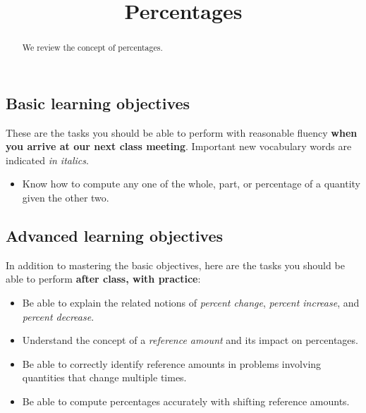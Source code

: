 \documentclass{ximera}
\title{Percentages}
\begin{document}
\begin{abstract}
We review the concept of percentages.
\end{abstract}
\maketitle

\subsection*{Basic learning objectives}

These are the tasks you should be able to perform with reasonable fluency \textbf{when you arrive at our next class meeting}. Important new vocabulary words are indicated \emph{in italics}. 

\begin{itemize}
	\item Know how to compute any one of the whole, part, or percentage of a quantity given the other two.
\end{itemize}

\subsection*{Advanced learning objectives}

In addition to mastering the basic objectives, here are the tasks you should be able to perform \textbf{after class, with practice}: 

\begin{itemize}
	\item Be able to explain the related notions of \emph{percent change}, \emph{percent increase}, and \emph{percent decrease}.
	\item Understand the concept of a \emph{reference amount} and its impact on percentages.
	\item Be able to correctly identify reference amounts in problems involving quantities that change multiple times.
	\item Be able to compute percentages accurately with shifting reference amounts.
\end{itemize}
\end{document}
